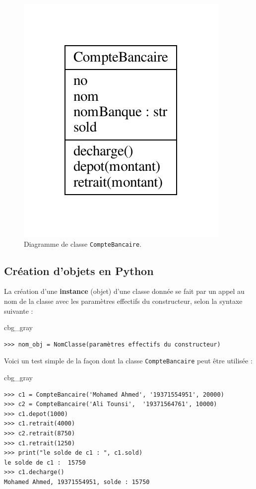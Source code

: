 \documentclass[%
oneside,                 %
final,                   %
10pt]{article}
\newenvironment{_cod_tight}[1]{
   \def\FrameCommand{\colorbox{#1}}
   \FrameRule0.6pt\MakeFramed {\FrameRestore}\vskip3mm}
   {\vskip0mm\endMakeFramed}
\newenvironment{cod}[1]{
\bgroup\rmfamily
\fboxsep=0mm\relax
\begin{_cod_tight}{#1}
\list{}{\parsep=-2mm\parskip=0mm\topsep=0pt\leftmargin=2mm
\rightmargin=2\leftmargin\leftmargin=4pt\relax}
\item\relax}
{\endlist\end{_cod_tight}\egroup}
\begin{document}
\noindent
\begin{figure}[!ht]  %
  \centerline{\includegraphics[width=0.5\linewidth]{scripts/classes_CompteBancaire.pdf}}
  \caption{
  Diagramme de classe \texttt{CompteBancaire}.
  }
\end{figure}


\subsection{Création d'objets en Python}
La création d'une \textbf{instance} (objet) d'une classe donnée se fait par un appel au nom de la classe avec les paramètres effectifs du constructeur, selon la syntaxe suivante :
\begin{cod}{cbg_gray}\begin{verbatim}
>>> nom_obj = NomClasse(paramètres effectifs du constructeur)
\end{verbatim}
\end{cod}
\noindent

Voici un test simple de la façon dont la classe \texttt{CompteBancaire} peut être utilisée :
\begin{cod}{cbg_gray}\begin{verbatim}
>>> c1 = CompteBancaire('Mohamed Ahmed', '19371554951', 20000)
>>> c2 = CompteBancaire('Ali Tounsi',  '19371564761', 10000)
>>> c1.depot(1000)
>>> c1.retrait(4000)
>>> c2.retrait(8750)
>>> c1.retrait(1250)
>>> print("le solde de c1 : ", c1.sold)
le solde de c1 :  15750
>>> c1.decharge()
Mohamed Ahmed, 19371554951, solde : 15750
\end{verbatim}
\end{cod}
\noindent
\end{document}
